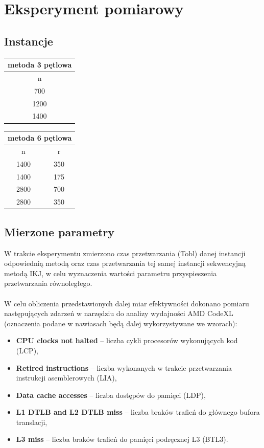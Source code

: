 \documentclass[12pt,a4paper]{article}
\begin{document}
\section{Eksperyment pomiarowy}

\subsection{Instancje}

\begin{table}[H]
\centering
\def\arraystretch{1.5}
\begin{tabular}{|c|}
\hline
metoda 3 pętlowa \\
\hline
n \\
\hline
700 \\
\hline
1200 \\
\hline
1400 \\
\hline
\end{tabular}
\hspace{70pt}
\begin{tabular}{|c|c|}  %
\hline
\multicolumn{2}{|c|}{metoda 6 pętlowa} \\
\hline
n & r\\
\hline
1400 & 350 \\
\hline
1400 & 175 \\
\hline
2800 & 700 \\
\hline
2800 & 350 \\
\hline
\end{tabular}
\end{table}

\subsection{Mierzone parametry}

W trakcie eksperymentu zmierzono czas przetwarzania (Tobl) danej instancji odpowiednią metodą oraz czas przetwarzania tej samej instancji sekwencyjną metodą IKJ, w celu wyznaczenia wartości parametru przyspieszenia przetwarzania równoległego.\\
\\
W celu obliczenia przedstawionych dalej miar efektywności dokonano pomiaru następujących zdarzeń w narzędziu do analizy wydajności AMD CodeXL (oznaczenia podane w nawiasach będą dalej wykorzystywane we wzorach):

\begin{itemize}
\item \textbf{CPU clocks not halted} -- liczba cykli procesorów wykonujących kod (LCP),
\item \textbf{Retired instructions} -- liczba wykonanych w trakcie przetwarzania instrukcji asemblerowych (LIA),
\item \textbf{Data cache accesses} -- liczba dostępów do pamięci (LDP),
\item \textbf{L1 DTLB and L2 DTLB miss} -- liczba braków  trafień do głównego bufora translacji,
\item \textbf{L3 miss} -- liczba braków trafień do pamięci podręcznej L3 (BTL3).
\end{itemize}
\end{document}
